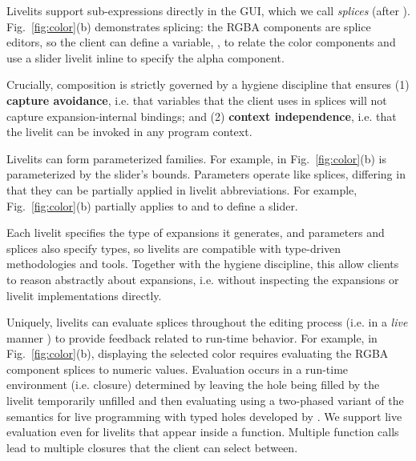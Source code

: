 %
  Livelits support sub-expressions directly in the GUI, which we call \emph{splices} (after
   \citet{TLMs}).
  Fig.~\ref{fig:color}(b) demonstrates splicing: the RGBA components  
  are splice editors, so the client can define a variable, ,
  to relate the color components 
  and use a slider livelit inline to specify the alpha component.
  
  Crucially, composition is strictly 
  governed by a hygiene discipline that ensures
  (1) \textbf{capture avoidance}, i.e. that variables that the client uses in splices 
  will not capture expansion-internal bindings; and 
  (2) \textbf{context independence}, i.e. that the livelit 
  can be invoked in any program context.%

 Livelits can form parameterized families.
  For example,  in Fig.~\ref{fig:color}(b) is parameterized by the slider's bounds.
  Parameters operate like splices, differing in that they can be partially applied in
  livelit abbreviations. For example, Fig.~\ref{fig:color}(b) 
  partially applies  to  and  to define a  slider.

 Each livelit specifies the type of expansions it generates, 
and parameters and splices also specify types, 
so livelits are compatible with type-driven methodologies and tools.
Together with the hygiene discipline, this allow clients to reason abstractly about expansions, i.e.  
without inspecting the expansions or livelit implementations directly.

 Uniquely, livelits can evaluate splices 
  throughout the editing process 
  (i.e. in a \emph{live} manner \cite{DBLP:conf/icse/Tanimoto13}) 
  to provide feedback related to run-time behavior.
  For example, in Fig.~\ref{fig:color}(b), 
  displaying the selected color requires evaluating the RGBA
  component splices to numeric values.
  Evaluation occurs in a run-time environment (i.e. closure) determined by
  leaving the hole being filled by the livelit temporarily unfilled and then evaluating
  using a two-phased variant of the semantics for 
  live programming with typed holes developed by \citet{HazelnutLive}.
  We support live evaluation even for livelits 
  that appear inside a function. Multiple function calls lead 
  to multiple closures that the client 
   can select between.

